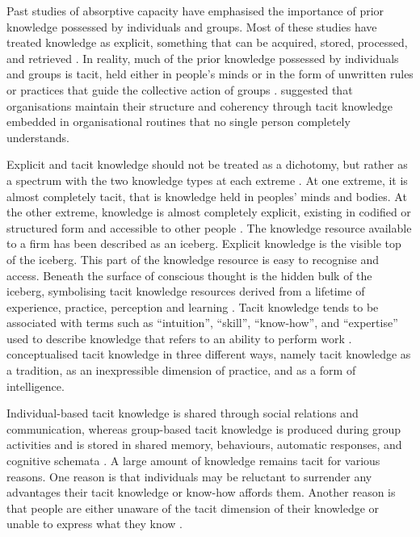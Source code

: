 Past studies of absorptive capacity have emphasised the importance of prior knowledge possessed by individuals and groups. Most of these studies have treated knowledge as explicit, something that can be acquired, stored, processed, and retrieved \citep{omidvar2013revisiting,marabelli2014knowing}. In reality, much of the prior knowledge possessed by individuals and groups is tacit, held either in people's minds or in the form of unwritten rules or practices that guide the collective action of groups \citep{mowery1996strategic,leonard1998role,burt2007secondhand,goksel2016can,lichtenthaler2016absorptive}. \citet{nelson1982evolutionary} suggested that organisations maintain their structure and coherency through tacit knowledge embedded in organisational routines that no single person completely understands. \medskip

Explicit and tacit knowledge should not be treated as a dichotomy, but rather as a spectrum with the two knowledge types at each extreme \citep{polanyi1967tacit,inkpen1998knowledge,cavusgil2003tacit}. At one extreme, it is almost completely tacit, that is knowledge held in peoples' minds and bodies. At the other extreme, knowledge is almost completely explicit, existing in codified or structured form and accessible to other people \citep{leonard1998role}. The knowledge resource available to a firm has been described as an iceberg. Explicit knowledge is the visible top of the iceberg. This part of the knowledge resource is easy to recognise and access. Beneath the surface of conscious thought is the hidden bulk of the iceberg, symbolising tacit knowledge resources derived from a lifetime of experience, practice, perception and learning \citep{spender1996making,haldin2000difficulties,mcadam2007exploring,rebernik2007fostering}. Tacit knowledge tends to be associated with terms such as \enquote{intuition}, \enquote{skill}, \enquote{know-how}, and \enquote{expertise} used to describe knowledge that refers to an ability to perform work \citep{mcadam2007exploring}. \citet{nielsen2002concept} conceptualised tacit knowledge in three different ways, namely tacit knowledge as a tradition, as an inexpressible dimension of practice, and as a form of intelligence. \medskip

Individual-based tacit knowledge is shared through social relations and communication, whereas group-based tacit knowledge is produced during group activities and is stored in shared memory, behaviours, automatic responses, and cognitive schemata \citep{goksel2016can}. A large amount of knowledge remains tacit for various reasons. One reason is that individuals may be reluctant to surrender any advantages their tacit knowledge or know-how affords them. Another reason is that people are either unaware of the tacit dimension of their knowledge or unable to express what they know \citep{leonard1998role,eraut2000non}. \medskip

